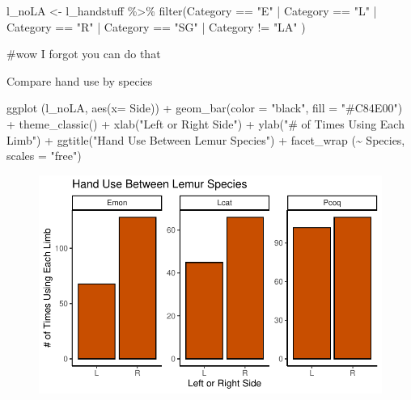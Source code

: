 \documentclass[
  letterpaper,
  DIV=11,
  numbers=noendperiod]{scrartcl}
\newenvironment{Shaded}{\begin{snugshade}}{\end{snugshade}}
\newcommand{\AttributeTok}[1]{\textcolor[rgb]{0.40,0.45,0.13}{#1}}
\newcommand{\CommentTok}[1]{\textcolor[rgb]{0.37,0.37,0.37}{#1}}
\newcommand{\FunctionTok}[1]{\textcolor[rgb]{0.28,0.35,0.67}{#1}}
\newcommand{\NormalTok}[1]{\textcolor[rgb]{0.00,0.23,0.31}{#1}}
\newcommand{\OtherTok}[1]{\textcolor[rgb]{0.00,0.23,0.31}{#1}}
\newcommand{\SpecialCharTok}[1]{\textcolor[rgb]{0.37,0.37,0.37}{#1}}
\newcommand{\StringTok}[1]{\textcolor[rgb]{0.13,0.47,0.30}{#1}}
\begin{document}
\begin{Shaded}
\begin{Highlighting}[]
\NormalTok{l\_noLA }\OtherTok{\textless{}{-}} 
\NormalTok{l\_handstuff }\SpecialCharTok{\%\textgreater{}\%} 
  \FunctionTok{filter}\NormalTok{(Category }\SpecialCharTok{==} \StringTok{"E"}  \SpecialCharTok{|}\NormalTok{  Category }\SpecialCharTok{==} \StringTok{"L"} \SpecialCharTok{|}\NormalTok{  Category }\SpecialCharTok{==} \StringTok{"R"} \SpecialCharTok{|}\NormalTok{  Category }\SpecialCharTok{==} \StringTok{"SG"} \SpecialCharTok{|}\NormalTok{ Category }\SpecialCharTok{!=} \StringTok{"LA"}\NormalTok{ )}

\CommentTok{\#wow I forgot you can do that}
\end{Highlighting}
\end{Shaded}

Compare hand use by species

\begin{Shaded}
\begin{Highlighting}[]
\FunctionTok{ggplot}\NormalTok{ (l\_noLA, }\FunctionTok{aes}\NormalTok{(}\AttributeTok{x=}\NormalTok{ Side)) }\SpecialCharTok{+}
  \FunctionTok{geom\_bar}\NormalTok{(}\AttributeTok{color =} \StringTok{"black"}\NormalTok{, }\AttributeTok{fill =} \StringTok{"\#C84E00"}\NormalTok{) }\SpecialCharTok{+}
  \FunctionTok{theme\_classic}\NormalTok{() }\SpecialCharTok{+}
  \FunctionTok{xlab}\NormalTok{(}\StringTok{"Left or Right Side"}\NormalTok{) }\SpecialCharTok{+}
  \FunctionTok{ylab}\NormalTok{(}\StringTok{"\# of Times Using Each Limb"}\NormalTok{) }\SpecialCharTok{+}
  \FunctionTok{ggtitle}\NormalTok{(}\StringTok{"Hand Use Between Lemur Species"}\NormalTok{) }\SpecialCharTok{+}
  \FunctionTok{facet\_wrap}\NormalTok{ (}\SpecialCharTok{\textasciitilde{}}\NormalTok{ Species, }\AttributeTok{scales =} \StringTok{"free"}\NormalTok{)}
\end{Highlighting}
\end{Shaded}

\begin{figure}[H]

{\centering \includegraphics{LeftyLemurs_files/figure-pdf/unnamed-chunk-25-1.pdf}

}

\end{figure}
\end{document}
